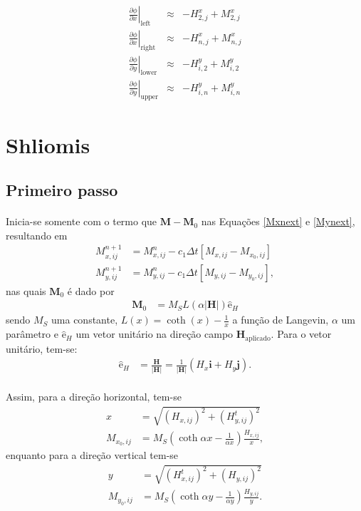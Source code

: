 \documentclass[eletromagnetismo.tex]{subfiles}
\begin{document}
\begin{eqnarray}
\left.\frac{\partial \phi}{\partial x}\right|_{\mathrm{left}}\;\;&\approx&- H^{x}_{2,j} + M^{x}_{2,j}\\
\left.\frac{\partial \phi}{\partial x}\right|_{\mathrm{right}}&\approx&- H^{x}_{n,j} + M^{x}_{n,j}\\
\left.\frac{\partial \phi}{\partial y}\right|_{\mathrm{lower}}&\approx&- H^{y}_{i,2} + M^{y}_{i,2}\\
\left.\frac{\partial \phi}{\partial y}\right|_{\mathrm{upper}}&\approx&- H^{y}_{i,n} + M^{y}_{i,n}
\end{eqnarray}

\section{Shliomis}
\subsection{Primeiro passo}
\paragraph{} Inicia-se somente com o termo que $\mathbf{M}-\mathbf{M}_0$ nas Equações \ref{Mxnext} e \ref{Mynext}, resultando em \begin{align}
M_{x,ij}^{n+1} & = M_{x,ij}^n -c_1\Delta t[M_{x,ij} - M_{x_0,ij}]\\
M_{y,ij}^{n+1} & = M_{y,ij}^n -c_1\Delta t[M_{y,ij} - M_{y_0,ij}], 
\end{align} nas quais $\mathbf{M}_0$ é dado por \begin{align}
	\mathbf{M}_0 & = M_S L(\alpha|\mathbf{H}|)\hat{\mathrm{e}}_H
\end{align} sendo $M_S$ uma constante, $L(x) = \coth(x) - \frac{1}{x}$ a função de Langevin, $\alpha$ um parâmetro e $\hat{\mathrm{e}}_H$ um vetor unitário na direção campo $\mathbf{H}_{\mathrm{aplicado}}$. Para o vetor unitário, tem-se: \begin{align}
	\hat{\mathrm{e}}_H & = \frac{\mathbf{H}}{|\mathbf{H}|} =  \frac{1}{|\mathbf{H}|}\left(H_x\mathbf{i} + H_y\mathbf{j}\right).
\end{align}

\paragraph{} Assim, para a direção horizontal, tem-se \begin{align}
x & = \sqrt{(H_{x,ij})^2 + (H_{y,ij}^t)^2}\\
M_{x_0,ij} & = M_S \left(\coth{\alpha x} - \frac{1}{\alpha x}\right)\frac{H_{x,ij}}{x},
\end{align} enquanto para a direção vertical tem-se \begin{align}
y & = \sqrt{(H_{x,ij}^t)^2 + (H_{y,ij})^2}\\
M_{y_0,ij} & = M_S \left(\coth{\alpha y} - \frac{1}{\alpha y}\right)\frac{H_{y,ij}}{y}.	
\end{align}
\end{document}
